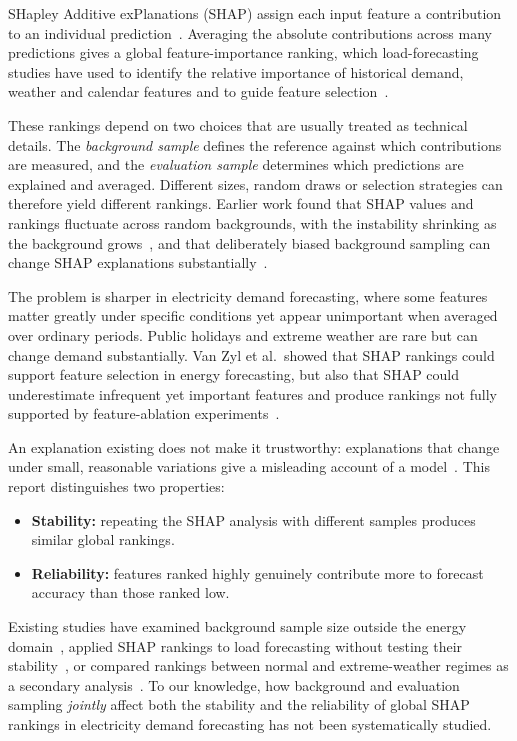 \documentclass[11pt,a4paper]{article}
\begin{document}
SHapley Additive exPlanations (SHAP) assign each input feature a contribution to an individual prediction~\cite{lundberg2017}. Averaging the absolute contributions across many predictions gives a global feature-importance ranking, which load-forecasting studies have used to identify the relative importance of historical demand, weather and calendar features and to guide feature selection~\cite{lee2023,vanzyl2024}.

These rankings depend on two choices that are usually treated as technical details. The \emph{background sample} defines the reference against which contributions are measured, and the \emph{evaluation sample} determines which predictions are explained and averaged. Different sizes, random draws or selection strategies can therefore yield different rankings. Earlier work found that SHAP values and rankings fluctuate across random backgrounds, with the instability shrinking as the background grows~\cite{yuan2023}, and that deliberately biased background sampling can change SHAP explanations substantially~\cite{laberge2023}.

The problem is sharper in electricity demand forecasting, where some features matter greatly under specific conditions yet appear unimportant when averaged over ordinary periods. Public holidays and extreme weather are rare but can change demand substantially. Van Zyl et al.\ showed that SHAP rankings could support feature selection in energy forecasting, but also that SHAP could underestimate infrequent yet important features and produce rankings not fully supported by feature-ablation experiments~\cite{vanzyl2024}.

An explanation existing does not make it trustworthy: explanations that change under small, reasonable variations give a misleading account of a model~\cite{alvarezmelis2018}. This report distinguishes two properties:
\begin{itemize}
  \item \textbf{Stability:} repeating the SHAP analysis with different samples produces similar global rankings.
  \item \textbf{Reliability:} features ranked highly genuinely contribute more to forecast accuracy than those ranked low.
\end{itemize}

Existing studies have examined background sample size outside the energy domain~\cite{yuan2023}, applied SHAP rankings to load forecasting without testing their stability~\cite{lee2023,vanzyl2024}, or compared rankings between normal and extreme-weather regimes as a secondary analysis~\cite{abubakkar2026}. To our knowledge, how background and evaluation sampling \emph{jointly} affect both the stability and the reliability of global SHAP rankings in electricity demand forecasting has not been systematically studied.
\end{document}
